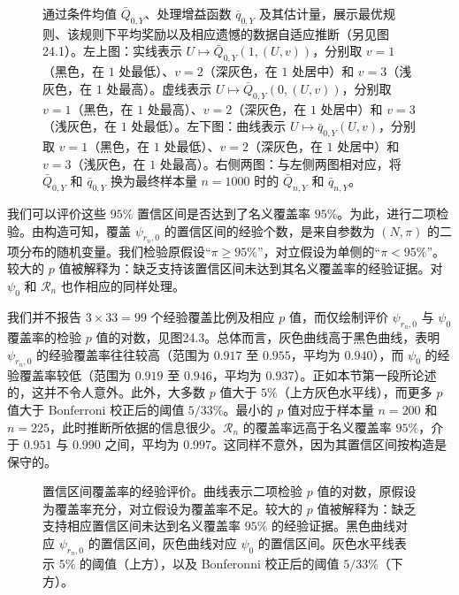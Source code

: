\begin{figure}[p]
 \centering
 
 \caption{通过条件均值 $\bar Q_{0,Y}$、处理增益函数 $\bar q_{0,Y}$ 及其估计量，展示最优规则、该规则下平均奖励以及相应遗憾的数据自适应推断（另见图24.1）。左上图：实线表示 $U\mapsto\bar Q_{0,Y}(1,(U,v))$，分别取 $v=1$（黑色，在 $1$ 处最低）、$v=2$（深灰色，在 $1$ 处居中）和 $v=3$（浅灰色，在 $1$ 处最高）。虚线表示 $U\mapsto\bar Q_{0,Y}(0,(U,v))$，分别取 $v=1$（黑色，在 $1$ 处最高）、$v=2$（深灰色，在 $1$ 处居中）和 $v=3$（浅灰色，在 $1$ 处最低）。左下图：曲线表示 $U\mapsto\bar q_{0,Y}(U,v)$，分别取 $v=1$（黑色，在 $1$ 处最低）、$v=2$（深灰色，在 $1$ 处居中）和 $v=3$（浅灰色，在 $1$ 处最高）。右侧两图：与左侧两图相对应，将 $\bar Q_{0,Y}$ 和 $\bar q_{0,Y}$ 换为最终样本量 $n=1000$ 时的 $\bar Q_{n,Y}$ 和 $\bar q_{n,Y}$。}
 \label{fig:ch24-conditional-means}
\end{figure}

我们可以评价这些 $95\%$ 置信区间是否达到了名义覆盖率 $95\%$。为此，进行二项检验。由构造可知，覆盖 $\psi_{r_n,0}$ 的置信区间的经验个数，是来自参数为 $(N,\pi)$ 的二项分布的随机变量。我们检验原假设“$\pi\geq95\%$”，对立假设为单侧的“$\pi<95\%$”。较大的 $p$ 值被解释为：缺乏支持该置信区间未达到其名义覆盖率的经验证据。对 $\psi_0$ 和 $\mathcal R_n$ 也作相应的同样处理。

我们并不报告 $3\times33=99$ 个经验覆盖比例及相应 $p$ 值，而仅绘制评价 $\psi_{r_n,0}$ 与 $\psi_0$ 覆盖率的检验 $p$ 值的对数，见图24.3。总体而言，灰色曲线高于黑色曲线，表明 $\psi_{r_n,0}$ 的经验覆盖率往往较高（范围为 $0.917$ 至 $0.955$，平均为 $0.940$），而 $\psi_0$ 的经验覆盖率较低（范围为 $0.919$ 至 $0.946$，平均为 $0.937$）。正如本节第一段所论述的，这并不令人意外。此外，大多数 $p$ 值大于 $5\%$（上方灰色水平线），而更多 $p$ 值大于 Bonferroni 校正后的阈值 $5/33\%$。最小的 $p$ 值对应于样本量 $n=200$ 和 $n=225$，此时推断所依据的信息很少。$\mathcal R_n$ 的覆盖率远高于名义覆盖率 $95\%$，介于 $0.951$ 与 $0.990$ 之间，平均为 $0.997$。这同样不意外，因为其置信区间按构造是保守的。

\begin{figure}[htbp]
 \centering
 
 \caption{置信区间覆盖率的经验评价。曲线表示二项检验 $p$ 值的对数，原假设为覆盖率充分，对立假设为覆盖率不足。较大的 $p$ 值被解释为：缺乏支持相应置信区间未达到名义覆盖率 $95\%$ 的经验证据。黑色曲线对应 $\psi_{r_n,0}$ 的置信区间，灰色曲线对应 $\psi_0$ 的置信区间。灰色水平线表示 $5\%$ 的阈值（上方），以及 Bonferonni 校正后的阈值 $5/33\%$（下方）。}
 \label{fig:ch24-coverage}
\end{figure}
\FloatBarrier
